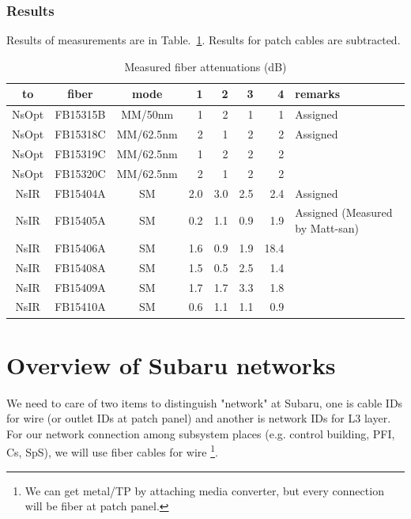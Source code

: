 \documentclass[a4paper,notitlepage]{article}
\begin{document}
\subsubsection{Results}

Results of measurements are in Table.~\ref{tab:subaru-measurement}. 
Results for patch cables are subtracted. 

\begin{table}[htb]
\begin{center}
\caption{Measured fiber attenuations (dB)}
\label{tab:subaru-measurement}
\begin{tabular}{c|c|c||r|r|r|r||l}
to & fiber & mode & 1 & 2 & 3 & 4 & remarks \\
\hline
NsOpt & FB15315B & MM/50nm & 1 & 2 & 1 & 1 & Assigned \\
NsOpt & FB15318C & MM/62.5nm & 2 & 1 & 2 & 2 & Assigned \\
NsOpt & FB15319C & MM/62.5nm & 1 & 2 & 2 & 2 & \\
NsOpt & FB15320C & MM/62.5nm & 2 & 1 & 2 & 2 & \\
NsIR & FB15404A & SM & 2.0 & 3.0 & 2.5 & 2.4 & Assigned \\
NsIR & FB15405A & SM & 0.2 & 1.1 & 0.9 & 1.9 & Assigned (Measured by Matt-san) \\
NsIR & FB15406A & SM & 1.6 & 0.9 & 1.9 & 18.4 & \\
NsIR & FB15408A & SM & 1.5 & 0.5 & 2.5 & 1.4 &  \\
NsIR & FB15409A & SM & 1.7 & 1.7 & 3.3 & 1.8 &  \\
NsIR & FB15410A & SM & 0.6 & 1.1 & 1.1 & 0.9 &  \\
\end{tabular}
\end{center}
\end{table}

\appendix

\section{Overview of Subaru networks}

We need to care of two items to distinguish "network" at Subaru, one is 
cable IDs for wire (or outlet IDs at patch panel) 
and another is network IDs for L3 layer. 
For our network connection among subsystem places (e.g. control building, 
PFI, Cs, SpS), we will use fiber cables for wire
\footnote{We can get metal/TP by attaching media converter, but every 
connection will be fiber at patch panel.}. 
\end{document}
